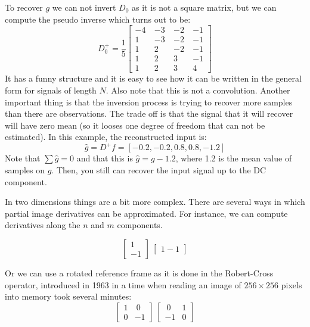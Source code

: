 To recover $g$ we can not invert $D_0$ as it is not a square matrix, but we can compute the pseudo inverse which turns out to be:
\begin{equation}
D_0^{+} = \frac{1}{5}
\begin{bmatrix}
  -4 ~& -3 ~& -2~& -1 \\
  1 ~& -3 ~& -2 ~&-1 \\
  1~& 2 ~& -2 ~& -1\\
  1~& 2 ~& 3 ~& -1\\
  1~& 2 ~& 3 ~& 4
 \end{bmatrix}
\end{equation}
It has a funny structure and it is easy to see how it can be written in the general form for signals of length $N$. Also note that this is not a convolution. 
Another important thing is that the inversion process is trying to recover more samples than there are observations. The trade off is that the signal that it will recover will have zero mean (so it looses one degree of freedom that can not be estimated). In this example, the reconstructed input is:
\begin{equation}
\hat g = D^{+} f= \left[-0.2, -0.2, 0.8, 0.8, -1.2\right]
\end{equation}
Note that $\sum \hat g = 0$ and that this is $\hat g = g - 1.2$, where 1.2 is the mean value of samples on $g$.
Then, you still can recover the input signal up to the DC component. 

In two dimensions things are a bit more complex. There are several ways in which partial image derivatives can be approximated. For instance, we can compute derivatives along the $n$ and $m$ components. 

\begin{equation}
\begin{bmatrix}
  1 \\
  -1
  \end{bmatrix}
  ~
  \begin{bmatrix}
  1 -1
  \end{bmatrix}
\end{equation}

Or we can use a rotated reference frame as it is done in the Robert-Cross operator, introduced in 1963 \cite{} in a time when reading an image of $256 \times 256$ pixels into memory took several minutes:
\begin{equation}
\begin{bmatrix}
  1 & ~0\\
 0 & -1
  \end{bmatrix}
  ~
  \begin{bmatrix}
  ~0 & 1 \\
  -1 & 0
  \end{bmatrix}
\end{equation}

